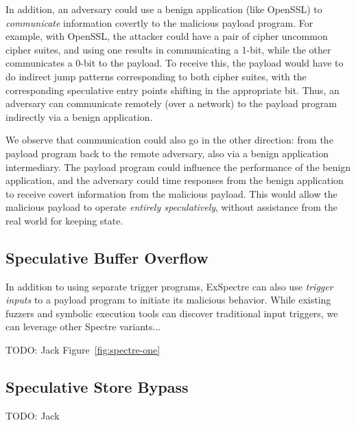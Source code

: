 \medskip

In addition, an adversary could use a benign application (like OpenSSL) to
\emph{communicate} information covertly to the malicious payload program. For
example, with OpenSSL, the attacker could have a pair of cipher uncommon cipher
suites, and using one results in communicating a 1-bit, while the other
communicates a 0-bit to the payload. To receive this, the payload would have to
do indirect jump patterns corresponding to both cipher suites, with the
corresponding speculative entry points shifting in the appropriate bit. Thus, an
adversary can communicate remotely (over a network) to the payload program
indirectly via a benign application.

We observe that communication could also go in the other direction: from
the payload program back to the remote adversary, also via a benign application
intermediary. The payload program could influence the performance of the benign
application, and the adversary could time responses from the benign application
to receive covert information from the malicious payload. This would allow the
malicious payload to operate \emph{entirely speculatively}, without assistance
from the real world for keeping state.





\subsection{Speculative Buffer Overflow}

\FigSpectreOne

In addition to using separate trigger programs, ExSpectre can also use
\emph{trigger inputs} to a payload program to initiate its malicious behavior.
While existing fuzzers and symbolic execution tools can discover traditional
input triggers, we can leverage other Spectre variants...


TODO: Jack Figure~\ref{fig:spectre-one}


\subsection{Speculative Store Bypass}

TODO: Jack


